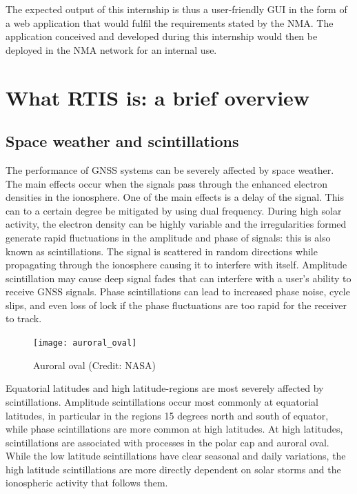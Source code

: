 \documentclass{themeensg}
\begin{document}
The expected output of this internship is thus a user-friendly GUI in the form of a web application that would fulfil the requirements stated by the NMA. The application conceived and developed during this internship would then be deployed in the NMA network for an internal use.
  \vspace{1.5cm}
	


\section{What RTIS is: a brief overview}

\subsection{Space weather and scintillations}

The performance of GNSS systems can be severely affected by space weather. The main effects occur when the signals pass through the enhanced electron densities in the ionosphere. One of the main effects is a delay of the signal. This can to a certain degree be mitigated by using dual frequency. During high solar activity, the electron density can be highly variable and the irregularities formed generate rapid fluctuations in the amplitude and phase of signals: this is also known as scintillations. The signal is scattered in random directions while propagating through the ionosphere causing it to interfere with itself. Amplitude scintillation may cause deep signal fades that can interfere with a user’s ability to receive GNSS signals. Phase scintillations can lead to increased phase noise, cycle slips, and even loss of lock if the phase fluctuations are too rapid for the receiver to track.\

\begin{figure}[hb]
	\centering
	\texttt{[image: auroral\_oval]}
	\caption{Auroral oval (Credit: NASA)}
\end{figure}

Equatorial latitudes and high latitude-regions are most severely affected by scintillations. Amplitude scintillations occur most commonly at equatorial latitudes, in particular in the regions 15 degrees north and south of equator, while phase scintillations are more common at high latitudes. At high latitudes, scintillations are associated with processes in the polar cap and auroral oval. While the low latitude scintillations have clear seasonal and daily variations, the high latitude scintillations are more directly dependent on solar storms and the ionospheric activity that follows them.\\
\end{document}
